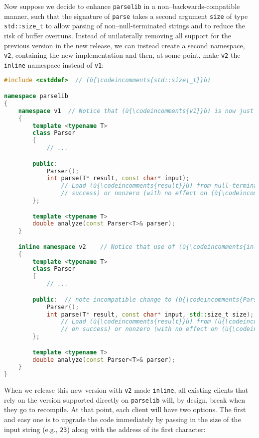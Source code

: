 Now suppose we decide to enhance \texttt{parselib} in a
non--backwards-compatible manner, such that the signature of
\texttt{parse} takes a second argument \texttt{size} of type
\texttt{std::size\_t} to allow parsing of non--null-terminated strings
and to reduce the risk of buffer overruns. Instead of unilaterally
removing all support for the previous version in the new release, we can
instead create a second namespace, \texttt{v2}, containing the new
implementation and then, at some point, make \texttt{v2} the
\texttt{inline} namespace instead of \texttt{v1}:

\begin{lstlisting}[language=C++]
#include <cstddef>  // (ù{\codeincomments{std::size\_t}}ù)

namespace parselib
{
    namespace v1  // Notice that (ù{\codeincomments{v1}}ù) is now just a nested namespace.
    {
        template <typename T>
        class Parser
        {
            // ...

        public:
            Parser();
            int parse(T* result, const char* input);
                // Load (ù{\codeincomments{result}}ù) from null-terminated (ù{\codeincomments{input}}ù); return 0 (on
                // success) or nonzero (with no effect on (ù{\codeincomments{result}}ù)).
        };

        template <typename T>
        double analyze(const Parser<T>& parser);
    }

    inline namespace v2    // Notice that use of (ù{\codeincomments{inline}}ù) keyword has moved here.
    {
        template <typename T>
        class Parser
        {
            // ...

        public:  // note incompatible change to (ù{\codeincomments{Parser}}ù)'s essential API
            Parser();
            int parse(T* result, const char* input, std::size_t size);
                // Load (ù{\codeincomments{result}}ù) from (ù{\codeincomments{input}}ù) of specified (ù{\codeincomments{size}}ù); return 0
                // on success) or nonzero (with no effect on (ù{\codeincomments{result}}ù)).
        };

        template <typename T>
        double analyze(const Parser<T>& parser);
    }
}
\end{lstlisting}
    
\noindent When we release this new version with \texttt{v2} made \texttt{inline},
all existing clients that rely on the version supported directly on
\texttt{parselib} will, by design, break when they go to recompile. At
that point, each client will have two options. The first and easy one is
to upgrade the code immediately by passing in the size of the input
string (e.g., \texttt{23}) along with the address of its first
character:

